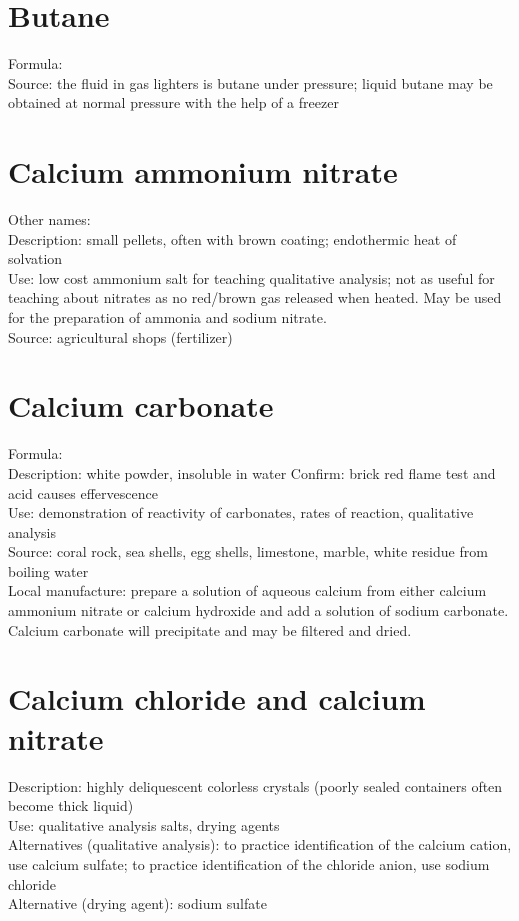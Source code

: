 \section{Butane}
\label{sec:}
Formula: \\
Source: the fluid in gas lighters is butane under pressure; 
liquid butane may be obtained at normal pressure with the help of a freezer

\section{Calcium ammonium nitrate}
\label{sec:}
Other names: \\
Description: small pellets, 
often with brown coating; 
endothermic heat of solvation\\
Use: low cost ammonium salt for teaching qualitative analysis; 
not as useful for teaching about nitrates 
as no red/brown gas released when heated. 
May be used for the preparation of ammonia and sodium nitrate.\\
Source: agricultural shops (fertilizer)\\

\section{Calcium carbonate}
\label{sec:}
Formula: \\
Description: white powder, 
insoluble in water
Confirm: brick red flame test and acid causes effervescence\\
Use: demonstration of reactivity of carbonates, 
rates of reaction, 
qualitative analysis\\
Source: coral rock, 
sea shells, 
egg shells, 
limestone, 
marble, 
white residue from boiling water\\
Local manufacture: prepare a solution of aqueous calcium 
from either calcium ammonium nitrate or calcium hydroxide 
and add a solution of sodium carbonate.\\ 
Calcium carbonate will precipitate and may be filtered and dried.

\section{Calcium chloride and calcium nitrate}
\label{sec:}
Description: highly deliquescent colorless crystals 
(poorly sealed containers often become thick liquid)\\
Use: qualitative analysis salts, 
drying agents\\
Alternatives (qualitative analysis): 
to practice identification of the calcium cation, 
use calcium sulfate; 
to practice identification of the chloride anion, 
use sodium chloride\\
Alternative (drying agent): sodium sulfate

